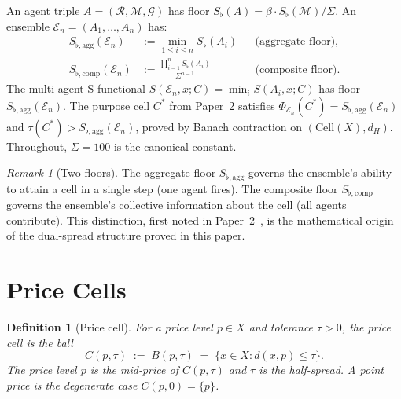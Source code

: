 \documentclass[twocolumn,11pt,a4paper]{article}
\newtheorem{definition}[theorem]{Definition}
\theoremstyle{remark}
\newtheorem{remark}[theorem]{Remark}
\newcommand{\Sflat}{S_{\flat}}
\newcommand{\Rec}{\mathcal{R}}
\newcommand{\Meth}{\mathcal{M}}
\newcommand{\tol}{\tau}
\newcommand{\Ens}{\mathcal{E}}
\newcommand{\SflatT}{S_{\flat,\mathrm{agg}}}        %
\newcommand{\SflatI}{S_{\flat,\mathrm{comp}}}       %
\begin{document}
An agent triple $A = (\Rec, \Meth, \mathcal{G})$ has floor
$\Sflat(A) = \beta \cdot \Sflat(\Meth)/\Sigma$.  An ensemble $\Ens_n =
(A_1,\ldots,A_n)$ has:
\begin{align}
  \SflatT(\Ens_n) &:= \min_{1\le i\le n} \Sflat(A_i)
  && \text{(aggregate floor)}, \label{eq:agg}\\
  \SflatI(\Ens_n) &:= \frac{\prod_{i=1}^n \Sflat(A_i)}{\Sigma^{n-1}}
  && \text{(composite floor)}. \label{eq:comp}
\end{align}
The multi-agent S-functional $S(\Ens_n, x; C) = \min_i S(A_i, x; C)$ has
floor $\SflatT(\Ens_n)$.  The purpose cell $C^*$ from Paper~2 satisfies
$\Phi_{\Ens_n}(C^*) = \SflatT(\Ens_n)$ and $\tol(C^*) > \SflatT(\Ens_n)$,
proved by Banach contraction on $(\mathrm{Cell}(X), d_H)$.  Throughout,
$\Sigma = 100$ is the canonical constant.

\begin{remark}[Two floors]
The aggregate floor $\SflatT$ governs the ensemble's ability to attain a
cell in a single step (one agent fires).  The composite floor $\SflatI$
governs the ensemble's collective information about the cell (all agents
contribute).  This distinction, first noted in
Paper~2~\cite{sachikonye2025market}, is the mathematical origin of the
dual-spread structure proved in this paper.
\end{remark}

\section{Price Cells}
\label{sec:price-cells}

\begin{definition}[Price cell]
\label{def:price-cell}
For a price level $p \in X$ and tolerance $\tol > 0$, the
\emph{price cell} is the ball
\[
  C(p, \tol) \;:=\; B(p, \tol) \;=\; \{x \in X : d(x, p) \le \tol\}.
\]
The price level $p$ is the \emph{mid-price} of $C(p,\tol)$ and $\tol$ is
the \emph{half-spread}.  A \emph{point price} is the degenerate case
$C(p, 0) = \{p\}$.
\end{definition}
\end{document}
